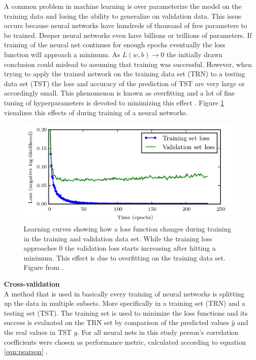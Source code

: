 A common problem in machine learning is over parameterize the model on the training data and losing
the ability to generalize on validation data. This issue occurs because neural networks have
hundreds of thousand of free parameters to be trained. Deeper neural networks even have billions or
trillions of parameters. If training of the neural net continues for enough epochs eventually the
loss function will approach a minimum. As $ L(w,b) \rightarrow 0 $ the initially drawn conclusion
could mislead to assuming that training was successful. However, when trying to apply the trained
network on the training data set (TRN) to a testing data set (TST) the loss and accuracy of the
prediction of TST are very large or accordingly small. This phenomenon is known as overfitting and a
lot of fine tuning of hyperparameters is devoted to minimizing this effect
\cite{tetko1995neural}. Figure \ref{fig:overfitting} visualizes this effects of during training
\cite{goodfellow2016deep} of a neural networks.

\begin{figure}[H]
  \centering \includegraphics[height=.35\textheight, width=1.0\textwidth]{Figures/overfitting}
  \decoRule
  \caption[Training vs. validation loss over time]{Learning curves showing how a loss function
    changes during training in the training and validation data set. While the training loss
    approaches 0 the validation loss starts increasing after hitting a minimum. This effect is due
    to overfitting on the training data set. Figure from \cite{goodfellow2016deep}.}
 \label{fig:overfitting}
\end{figure}

\textbf{Cross-validation} \\

A method that is used in basically every training of neural networks is splitting up the data in
multiple subsets. More specifically in a training set (TRN) and a testing set (TST). The training
set is used to minimize the loss functions and its success is evaluated on the TRN set by comparison
of the predicted values $\hat{y}$ and the real values in TST $y$. For all neural nets in this study
person's correlation coefficients were chosen as performance metric, calculated according to
equation \ref{eqn:pearson} \cite{soper1917distribution}.

